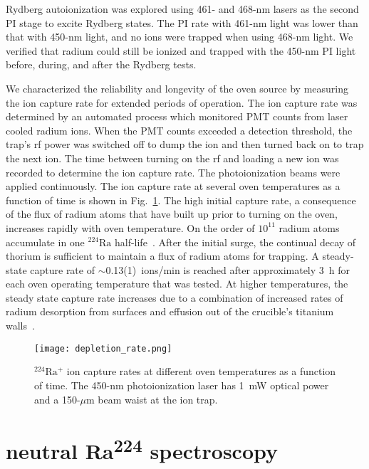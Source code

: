 \documentclass[
 reprint,
 amsmath,amssymb,
 aps,
 prr,
 superscriptaddress,
]{revtex4-2}
\newcommand{\iso}[2]{\ensuremath{^{#2}\mathrm{#1}}}
\begin{document}
Rydberg autoionization was explored using 461- and 468-nm lasers as the second PI stage to excite Rydberg states. The PI rate with 461-nm light was lower than that with 450-nm light, and no ions were trapped when using 468-nm light. We verified that radium could still be ionized and trapped with the 450-nm PI light before, during, and after the Rydberg tests.

We characterized the reliability and longevity of the oven source by measuring the ion capture rate for extended periods of operation. The ion capture rate was determined by an automated process which monitored PMT counts from laser cooled radium ions. When the PMT counts exceeded a detection threshold, the trap's rf power was switched off to dump the ion and then turned back on to trap the next ion. The time between turning on the rf and loading a new ion was recorded to determine the ion capture rate. The photoionization beams were applied continuously. The ion capture rate at several oven temperatures as a function of time is shown in Fig.~\ref{fig:loading-rate-temps}. The high initial capture rate, a consequence of the flux of radium atoms that have built up prior to turning on the oven, increases rapidly with oven temperature. On the order of $10^{11}$ radium atoms accumulate in one \iso{Ra}{224} half-life~\cite{radioactivedecay}. After the initial surge, the continual decay of thorium is sufficient to maintain a flux of radium atoms for trapping. A steady-state capture rate of $\sim$0.13(1)~ions/min is reached after approximately 3~h for each oven operating temperature that was tested. At higher temperatures, the steady state capture rate increases due to a combination of increased rates of radium desorption from surfaces and effusion out of the crucible's titanium walls~\cite{Beyer2003,Melconian2005}.

\begin{figure}
    \centering
    \texttt{[image: depletion\_rate.png]}
    \caption{\iso{Ra}{224}$^+$ ion capture rates at different oven temperatures as a function of time. The 450-nm photoionization laser has 1~mW optical power and a 150-$\mu$m beam waist at the ion trap.}
    \label{fig:loading-rate-temps}
\end{figure}


\section{neutral Ra\textsuperscript{224} spectroscopy}
\end{document}
